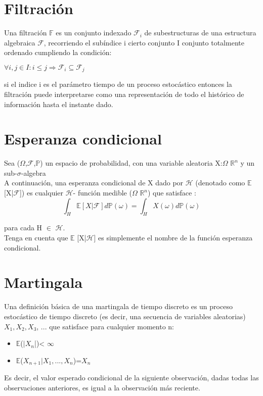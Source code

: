 \documentclass[letterpaper, 10 pt, conference]{ieeeconf}  %
\begin{document}
\section{Filtración}
Una filtración \(\mathbb{F}\) es un conjunto indexado \(\mathcal{F}_{i}\) de subestructuras de una estructura algebraica \(\mathcal{F}\), recorriendo el subíndice i cierto conjunto I conjunto totalmente ordenado cumpliendo la condición:
\begin{center}
    $
\forall i,j \in I : i\leq j \Rightarrow \mathcal{F}_{i} \subseteq \mathcal{F}_{j} $
\end{center}


si el indice i es el parámetro tiempo de un proceso estocástico entonces la filtración puede interpretarse como una representación de todo el histórico de información hasta el instante dado.
\section{Esperanza condicional}\label{sec:2.1}
Sea ($\Omega$,$\mathcal{F}$,$\mathbb{P}$) un espacio de probabilidad, con una variable aleatoria  X:$\Omega$ \xrightarrow{} \(\mathbb{R}^{n}\) y un sub-$\sigma$-algebra \\
A continuación, una esperanza condicional de X dado por $\mathcal{H}$ (denotado como  $\mathbb{E}$ [X|$\mathcal{F}$]) es cualquier $\mathcal{H}$- función medible ($\Omega$ \xrightarrow{} $\mathbb{R}^{n}$) que satisface : \\

\begin{equation*}
\int_{H}^{} \mathbb{E} [X|\mathcal{F}] d\mathbb{P}(\omega) = \int_{H}^{} X(\omega) d \mathbb{P}(\omega)
\end{equation*}

para cada H $\in$ \(\mathcal{H}\). \\
Tenga en cuenta que $\mathbb{E}$ [X|$\mathcal{H}$] es simplemente el nombre de la función esperanza condicional.


\section{Martingala}\label{sec:2.2}
Una definición básica de una martingala de tiempo discreto es un proceso estocástico de tiempo discreto (es decir, una secuencia de variables aleatorias)$ X_{1}, X_{2}, X_{3}$, ... que satisface para cualquier momento n:
\begin{itemize}
\item \(\mathbb{E}\)($|X_{n}$|)< $\infty$
\item \(\mathbb{E}\)($X_{n+1}|X_{1},...,X_{n}$)=$X_{n}$
\end{itemize}
Es decir, el valor esperado condicional de la siguiente observación, dadas todas las observaciones anteriores, es igual a la observación más reciente.\\
\end{document}
